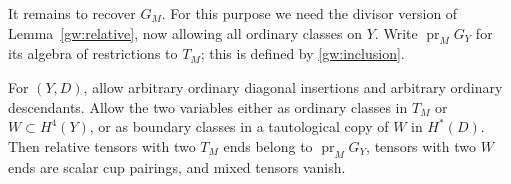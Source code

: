 It remains to recover $G_M$.  For this purpose we need the divisor version
of Lemma~\ref{gw:relative}, now allowing all ordinary classes on $Y$.
Write $\operatorname{pr}_M G_Y$ for its algebra of restrictions to $T_M$;
this is defined by \eqref{gw:inclusion}.

\begin{lemma}
\label{gw:divisor}
For $(Y,D)$, allow arbitrary ordinary diagonal insertions and arbitrary
ordinary descendants.  Allow the two variables either as ordinary classes
in $T_M$ or $W\subset H^4(Y)$, or as boundary classes in a tautological
copy of $W$ in $H^*(D)$.  Then relative tensors with two $T_M$ ends belong
to $\operatorname{pr}_M G_Y$, tensors with two $W$ ends are scalar cup
pairings, and mixed tensors vanish.
\end{lemma}
